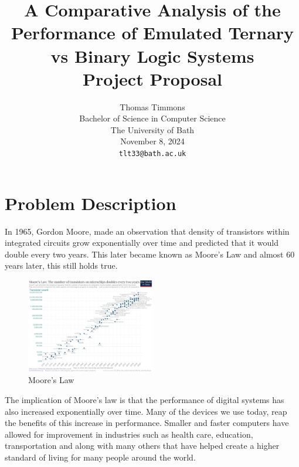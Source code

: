 \documentclass{article}
\title{A Comparative Analysis of the Performance of Emulated Ternary vs Binary Logic Systems \\ [1ex] \large Project Proposal}
\author{
  Thomas Timmons \\
  Bachelor of Science in Computer Science \\
  The University of Bath \\
  November 8, 2024 \\
  \texttt{tlt33@bath.ac.uk} \\
}
\begin{document}
\maketitle


\section{Problem Description}


In 1965, Gordon Moore, made an observation that density of transistors within integrated circuits
grow exponentially over time and predicted that it would double every two years. 
This later became known as Moore's Law and almost 60 years later, this still holds true.

\begin{figure}[h]
  \centering
  \includegraphics[width=0.5\textwidth]{figures/moores_law.png}
  \caption{Moore's Law}
  \label{fig:moores_law}
\end{figure}

The implication of Moore's law is that the performance of digital systems has also increased exponentially over time.
\citep{moore1965cramming}
Many of the devices we use today, reap the benefits of this increase in performance. Smaller and faster computers
have allowed for improvement in industries such as health care, education, transportation and along with many others 
that have helped create a higher standard of living for many people around the world.
\end{document}
